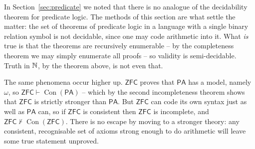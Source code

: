 \documentclass[a4paper]{scrartcl}
\newcommand{\PA}{\mathsf{PA}}
\newcommand{\ZFC}{\mathsf{ZFC}}
\newcommand{\Con}{\operatorname{Con}}
\begin{document}
\begin{remark}
  In Section~\ref{sec:predicate} we noted that there is no analogue of the decidability theorem for predicate logic. The methods of this section are what settle the matter: the set of theorems of predicate logic in a language with a single binary relation symbol is not decidable, since one may code arithmetic into it. What \emph{is} true is that the theorems are recursively enumerable -- by the completeness theorem we may simply enumerate all proofs -- so validity is semi-decidable. Truth in $\mathbb{N}$, by the theorem above, is not even that.
\end{remark}

The same phenomena occur higher up. $\ZFC$ proves that $\PA$ has a model, namely $\omega$, so $\ZFC \vdash \Con(\PA)$ -- which by the second incompleteness theorem shows that $\ZFC$ is strictly stronger than $\PA$. But $\ZFC$ can code its own syntax just as well as $\PA$ can, so if $\ZFC$ is consistent then $\ZFC$ is incomplete, and $\ZFC \not\vdash \Con(\ZFC)$. There is no escape by moving to a stronger theory: any consistent, recognisable set of axioms strong enough to do arithmetic will leave some true statement unproved.
\end{document}
